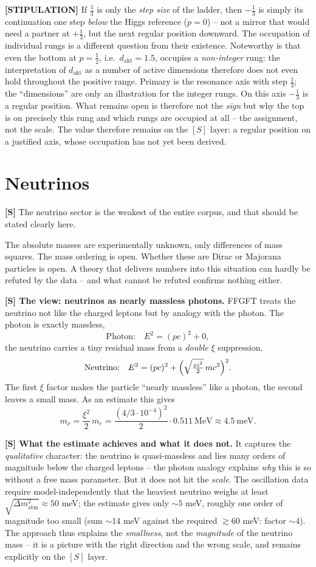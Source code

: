 \textbf{[STIPULATION]} If $\tfrac13$ is only the \emph{step size} of the ladder,
then $-\tfrac13$ is simply its continuation one step \emph{below} the Higgs
reference ($p=0$) -- not a mirror that would need a partner at $+\tfrac13$, but the
next regular position downward. The occupation of individual rungs is a different
question from their existence. Noteworthy is that even the bottom at $p=\tfrac12$,
i.e.\ $d_\text{akt}=1{.}5$, occupies a \emph{non-integer} rung: the interpretation
of $d_\text{akt}$ as a number of active dimensions therefore does not even hold
throughout the positive range. Primary is the resonance axis with step $\tfrac13$;
the ``dimensions'' are only an illustration for the integer rungs. On this axis
$-\tfrac13$ is a regular position. What remains open is therefore not the
\emph{sign} but why the top is on precisely this rung and which rungs are occupied
at all -- the assignment, not the scale. The value therefore remains on the $[S]$
layer: a regular position on a justified axis, whose occupation has not yet been
derived.

\section{Neutrinos}

\textbf{[S]} The neutrino sector is the weakest of the entire corpus, and that
should be stated clearly here.

The absolute masses are experimentally unknown, only differences of mass squares.
The mass ordering is open. Whether these are Dirac or Majorana particles is open.
A theory that delivers numbers into this situation can hardly be refuted by the
data -- and what cannot be refuted confirms nothing either.

\textbf{[S] The view: neutrinos as nearly massless photons.} FFGFT treats the
neutrino not like the charged leptons but by analogy with the photon. The photon
is exactly massless,
\[
  \text{Photon:}\quad E^2 = (pc)^2 + 0,
\]
the neutrino carries a tiny residual mass from a \emph{double} $\xi$ suppression,
\[
  \text{Neutrino:}\quad E^2 = (pc)^2 + \Bigl(\sqrt{\tfrac{\xi^2}{2}}\,mc^2\Bigr)^2 .
\]
The first $\xi$ factor makes the particle ``nearly massless'' like a photon,
the second leaves a small mass. As an estimate this gives
\[
  m_\nu = \frac{\xi^2}{2}\,m_e
        = \frac{(4/3\cdot10^{-4})^2}{2}\cdot 0{.}511\ \text{MeV}
        \approx 4{.}5\ \text{meV}.
\]

\textbf{[S] What the estimate achieves and what it does not.} It captures the
\emph{qualitative} character: the neutrino is quasi-massless and lies many orders
of magnitude below the charged leptons -- the photon analogy explains
\emph{why} this is so without a free mass parameter. But it does not hit the
\emph{scale}. The oscillation data require model-independently that the heaviest
neutrino weighs at least $\sqrt{\Delta m^2_\text{atm}} \approx 50$ meV; the
estimate gives only $\sim5$ meV, roughly one order of magnitude too small (sum
$\sim14$ meV against the required $\gtrsim60$ meV: factor $\sim4$). The approach
thus explains the \emph{smallness}, not the \emph{magnitude} of the neutrino
mass -- it is a picture with the right direction and the wrong scale, and remains
explicitly on the $[S]$ layer.

